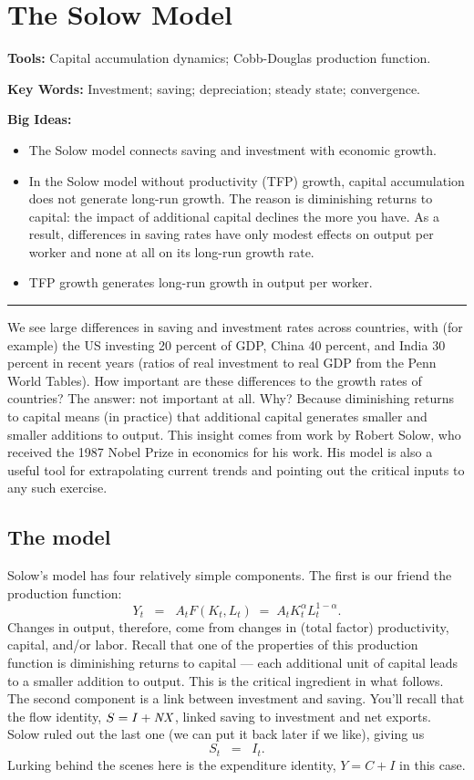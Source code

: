 \chapter{The Solow Model}\label{chp:solo}
\hypertarget{solow}{}

\textbf{Tools:} Capital accumulation dynamics; Cobb-Douglas production function.

\textbf{Key Words:} Investment; saving; depreciation; steady state; convergence.

\textbf{Big Ideas:}
\vspace{-0.1in}
\begin{itemize}
\item The Solow model connects saving and investment with economic growth.
\item In the Solow model without productivity (TFP) growth,
capital accumulation does not generate long-run growth.
The reason is diminishing returns to capital:
the impact of additional capital declines the more you have.
    As a result, differences in saving rates have only modest effects on output per worker
    and none at all on its long-run growth rate.
\item TFP growth generates long-run growth in output per worker.
\end{itemize}
\rule{\textwidth}{1pt}

We see large differences in saving and investment rates across
countries, with (for example) the US investing 20 percent of GDP,
China 40 percent, and India 30 percent in recent years
(ratios of real investment to real GDP from the Penn World Tables).
How important are these differences to the growth rates of countries?
The answer:  not important at all.
Why?  Because diminishing returns to capital means
(in practice) that additional capital generates smaller and smaller
additions to output.
This insight comes from work by Robert Solow,
who received the 1987 Nobel Prize in economics for his work.
His model is also a useful tool for extrapolating current trends
and pointing out the critical inputs to any such exercise.


\section{The model}
%
Solow's model has four relatively simple components.
The first is our friend the production function:
\begin{equation}
    Y_t \;\;=\;\; A_tF(K_t,L_t) \;=\; A_t K_t^{\alpha} L_t^{1-\alpha}.
        \label{eq:pf_solow}
\end{equation}
Changes in output, therefore, come from changes in
(total factor) productivity, capital, and/or labor.
Recall that one of the properties of this production function
is diminishing returns to capital --- each additional unit of capital leads to a smaller addition to output.
This is the critical ingredient in what follows.
The second component is a link between investment and saving.
You'll recall that the flow identity,
$  S = I + \mbox{\em NX\/} $,
linked saving to investment and net exports.
Solow ruled out the last one (we can put it back later if we like),
giving us
\[
    S_t \;\;=\;\; I_t.
\]
Lurking behind the scenes here is the expenditure identity,
$ Y = C + I$ in this case.

